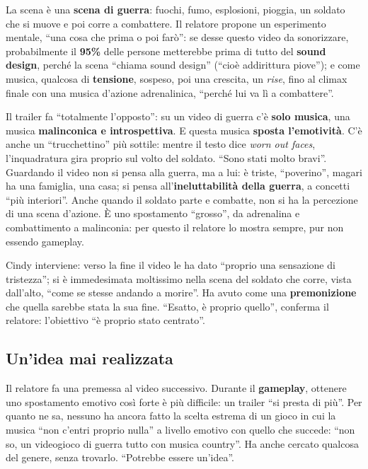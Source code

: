 La scena è una \textbf{scena di guerra}: fuochi, fumo, esplosioni, pioggia, un
soldato che si muove e poi corre a combattere. Il relatore propone un
esperimento mentale, ``una cosa che prima o poi farò'': se desse questo video da
sonorizzare, probabilmente il \textbf{95\%} delle persone metterebbe prima di
tutto del \textbf{sound design}, perché la scena ``chiama sound design'' (``cioè
addirittura piove''); e come musica, qualcosa di \textbf{tensione}, sospeso, poi
una crescita, un \emph{rise}, fino al climax finale con una musica d'azione
adrenalinica, ``perché lui va lì a combattere''.

Il trailer fa ``totalmente l'opposto'': su un video di guerra c'è \textbf{solo
musica}, una musica \textbf{malinconica e introspettiva}. E questa musica
\textbf{sposta l'emotività}. C'è anche un ``trucchettino'' più sottile: mentre il
testo dice \emph{worn out faces}, l'inquadratura gira proprio sul volto del
soldato. ``Sono stati molto bravi''. Guardando il video non si pensa alla guerra,
ma a lui: è triste, ``poverino'', magari ha una famiglia, una casa; si pensa
all'\textbf{ineluttabilità della guerra}, a concetti ``più interiori''. Anche
quando il soldato parte e combatte, non si ha la percezione di una scena d'azione.
È uno spostamento ``grosso'', da adrenalina e combattimento a malinconia: per
questo il relatore lo mostra sempre, pur non essendo gameplay.

Cindy interviene: verso la fine il video le ha dato ``proprio una sensazione di
tristezza''; si è immedesimata moltissimo nella scena del soldato che corre,
vista dall'alto, ``come se stesse andando a morire''. Ha avuto come una
\textbf{premonizione} che quella sarebbe stata la sua fine. ``Esatto, è proprio
quello'', conferma il relatore: l'obiettivo ``è proprio stato centrato''.

\subsection{Un'idea mai realizzata}

Il relatore fa una premessa al video successivo. Durante il \textbf{gameplay},
ottenere uno spostamento emotivo così forte è più difficile: un trailer ``si
presta di più''. Per quanto ne sa, nessuno ha ancora fatto la scelta estrema di
un gioco in cui la musica ``non c'entri proprio nulla'' a livello emotivo con
quello che succede: ``non so, un videogioco di guerra tutto con musica country''.
Ha anche cercato qualcosa del genere, senza trovarlo. ``Potrebbe essere
un'idea''.


